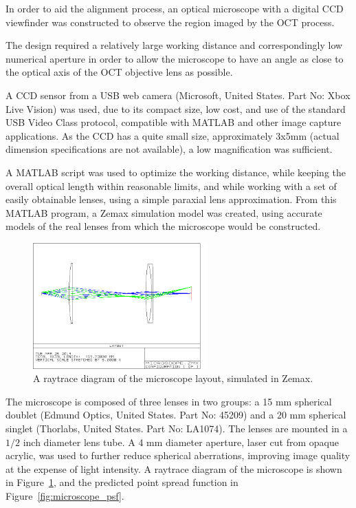 In order to aid the alignment process, an optical microscope with a digital CCD viewfinder was constructed to observe the region imaged by the OCT process.

The design required a relatively large working distance and correspondingly low numerical aperture in order to allow the microscope to have an angle as close to the optical axis of the OCT objective lens as possible.

A CCD sensor from a USB web camera (Microsoft, United States. Part No: Xbox Live Vision) was used, due to its compact size, low cost, and use of the standard USB Video Class protocol, compatible with MATLAB and other image capture applications. As the CCD has a quite small size, approximately 3x5mm (actual dimension specifications are not available), a low magnification was sufficient.

A MATLAB script was used to optimize the working distance, while keeping the overall optical length within reasonable limits, and while working with a set of easily obtainable lenses, using a simple paraxial lens approximation. From this MATLAB program, a Zemax simulation model was created, using accurate models of the real lenses from which the microscope would be constructed.

\begin{figure}[h!]
\centering
\includegraphics[width=0.6\textwidth]{Images/Zemax/microscope_layout_2.png}
\caption{A raytrace diagram of the microscope layout, simulated in Zemax.\label{fig:microscope_raytrace}}
\end{figure}

The microscope is composed of three lenses in two groups: a 15 mm spherical doublet (Edmund Optics, United States. Part No: 45209) and a 20 mm spherical singlet (Thorlabs, United States. Part No: LA1074). The lenses are mounted in a $1/2$ inch diameter lens tube. A 4 mm diameter aperture, laser cut from opaque acrylic, was used to further reduce spherical aberrations, improving image quality at the expense of light intensity. A raytrace diagram of the microscope is shown in Figure~\ref{fig:microscope_raytrace}, and the predicted point spread function in Figure~\ref{fig:microscope_psf}.

